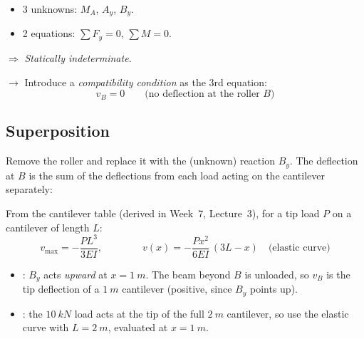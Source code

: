 \documentclass[11pt]{article}
\begin{document}
\begin{itemize}[label=$\rightarrow$]
  \item 3 unknowns: $M_A$, $A_y$, $B_y$.
  \item 2 equations: $\sum F_y = 0$, $\sum M = 0$.
\end{itemize}
\begin{center}
  $\Rightarrow$ \emph{Statically indeterminate.}
\end{center}

\noindent
$\rightarrow$ Introduce a \emph{compatibility condition} as the 3rd equation:
\[
  \boxed{v_B = 0} \qquad \text{(no deflection at the roller $B$)}
\]

\subsection*{Superposition}

\noindent
Remove the roller and replace it with the (unknown) reaction $B_y$. The deflection at $B$ is
the sum of the deflections from each load acting on the cantilever separately:

\begin{center}
\quad{\Large $+$}\quad
{}
\end{center}

\noindent
From the cantilever table (derived in Week~7, Lecture~3), for a tip load $P$ on a
cantilever of length $L$:
\[
  v_{\max} = -\frac{PL^3}{3EI},
  \qquad\qquad
  v(x) = -\frac{Px^2}{6EI}\,(3L - x) \quad \text{(elastic curve)}
\]
\begin{itemize}
  \item {}: $B_y$ acts \emph{upward} at $x = \SI{1}{m}$. The beam beyond $B$ is
        unloaded, so $v_B$ is the tip deflection of a $\SI{1}{m}$ cantilever (positive,
        since $B_y$ points up).
  \item {}: the $\SI{10}{kN}$ load acts at the tip of the full $\SI{2}{m}$
        cantilever, so use the elastic curve with $L = \SI{2}{m}$, evaluated at
        $x = \SI{1}{m}$.
\end{itemize}
\end{document}

